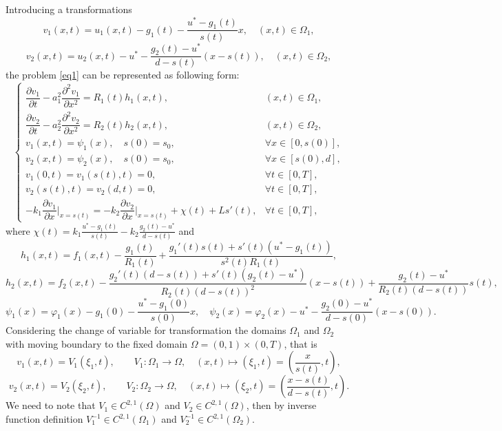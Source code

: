 \documentclass[preprint,12pt,authoryear]{elsarticle}
\begin{document}
Introducing a transformations
\begin{equation}\label{eq2}
    v_1(x,t)=u_1(x,t)-g_1(t)-\dfrac{u^*-g_1(t)}{s(t)}x,\quad (x,t)\in\Omega_1,
\end{equation}
\begin{equation}\label{eq3}
    v_2(x,t)=u_2(x,t)-u^*-\dfrac{g_2(t)-u^*}{d-s(t)}(x-s(t)),\quad (x,t)\in\Omega_2,
\end{equation}
the problem \eqref{eq1} can be represented as following form:
\begin{equation}\label{eq4}
    \begin{cases}
        \dfrac{\partial v_1}{\partial t}-a_1^2\dfrac{\partial^2v_1}{\partial x^2}=R_1(t)h_1(x,t),&(x,t)\in\Omega_1,\\
        \dfrac{\partial v_2}{\partial t}-a_2^2\dfrac{\partial^2v_2}{\partial x^2}=R_2(t)h_2(x,t),&(x,t)\in\Omega_2,\\
        v_1(x,t)=\psi_1(x),\quad s(0)=s_0,& \forall x\in[0,s(0)],\\
        v_2(x,t)=\psi_2(x),\quad s(0)=s_0,& \forall x\in[s(0),d],\\
        v_1(0,t)=v_1(s(t),t)=0,& \forall t\in[0,T],\\
        v_2(s(t),t)=v_2(d,t)=0,& \forall t\in[0,T],\\
        -k_1\dfrac{\partial v_1}{\partial x}\bigg|_{x=s(t)}=-k_2\dfrac{\partial v_2}{\partial x}\bigg|_{x=s(t)}+\chi(t)+Ls'(t),& \forall t\in[0,T],
    \end{cases}
\end{equation}
where $\chi(t)=k_1\frac{u^*-g_1(t)}{s(t)}-k_2\frac{g_2(t)-u^*}{d-s(t)}$ and
\begin{equation}\label{eq5}
    h_1(x,t)=f_1(x,t)-\dfrac{g_1(t)}{R_1(t)}+\dfrac{g_1'(t)s(t)+s'(t)(u^*-g_1(t))}{s^2(t)R_1(t)},
\end{equation}
\begin{equation}\label{eq6}
    h_2(x,t)=f_2(x,t)-\dfrac{g_2'(t)(d-s(t))+s'(t)(g_2(t)-u^*)}{R_2(t)(d-s(t))^2}(x-s(t))+\dfrac{g_2(t)-u^*}{R_2(t)(d-s(t))}s(t),
\end{equation}
\begin{equation}\label{eq7}
    \psi_1(x)=\varphi_1(x)-g_1(0)-\dfrac{u^*-g_1(0)}{s(0)}x,\quad \psi_2(x)=\varphi_2(x)-u^*-\dfrac{g_2(0)-u^*}{d-s(0)}(x-s(0)).
\end{equation}
Considering the change of variable for transformation the domains $\Omega_1$ and $\Omega_2$ with moving boundary to the fixed domain $\Omega=(0,1)\times(0,T)$, that is
\begin{equation}\label{eq8}
    v_1(x,t)=V_1(\xi_1,t),\quad\quad V_1: \Omega_1\longrightarrow\Omega,\quad (x,t)\mapsto (\xi_1,t)=\left(\dfrac{x}{s(t)},t\right),
\end{equation}
\begin{equation}\label{eq9}
    v_2(x,t)=V_2(\xi_2,t),\quad\quad V_2: \Omega_2\longrightarrow\Omega,\quad (x,t)\mapsto(\xi_2,t)=\left(\dfrac{x-s(t)}{d-s(t)},t\right).
\end{equation}
We need to note that $V_1\in C^{2,1}(\Omega)$ and $V_2\in C^{2,1}(\Omega)$, then by inverse function definition $V_1^{-1}\in C^{2,1}(\Omega_1)$ and $V_2^{-1}\in C^{2,1}(\Omega_2)$. 
\end{document}
